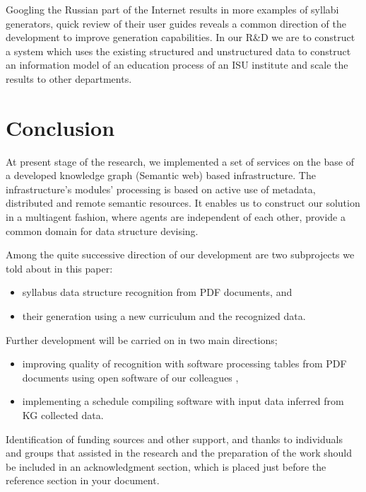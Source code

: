 \documentclass[
]{aiitart}
\begin{document}
Googling the Russian part of the Internet results in more examples of syllabi generators, quick review of their user guides reveals a common direction of the development to improve generation capabilities.  In our R\&D we are to construct a system which uses the existing structured and unstructured data to construct an information model of an education process of an ISU institute and scale the results to other departments.

\section*{Conclusion}

At present stage of the research, we implemented a set of services on the base of a developed knowledge graph (Semantic web) based infrastructure.  The infrastructure's modules' processing is based on active use of metadata, distributed and remote semantic resources.  It enables us to construct our solution in a multiagent fashion, where agents are independent of each other, provide a common domain for data structure devising.

Among the quite successive direction of our development are two subprojects we told about in this paper:
\begin{itemize}
    \item syllabus data structure recognition from PDF documents, and
    \item their generation using a new curriculum and the recognized data.
\end{itemize}
Further development will be carried on in two main directions;
\begin{itemize}
    \item improving quality of recognition with software processing tables from PDF documents using open software of our colleagues \cite{Shigarov_2016,Shigarov_2017},
    \item implementing a schedule compiling software with input data inferred from KG collected data.
\end{itemize}


\begin{acknowledgments}
Identification of funding sources and other support, and thanks to
individuals and groups that assisted in the research and the
preparation of the work should be included in an acknowledgment
section, which is placed just before the reference section in your
document.
\end{acknowledgments}
\end{document}
